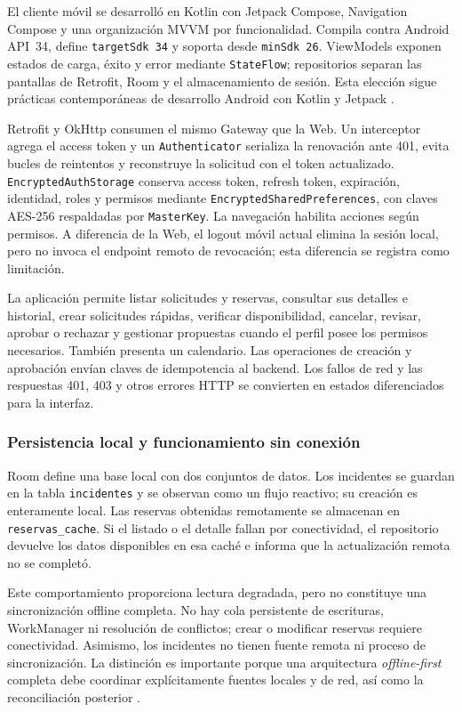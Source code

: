 El cliente móvil se desarrolló en Kotlin con Jetpack Compose, Navigation
Compose y una organización MVVM por funcionalidad. Compila contra Android
API~34, define \texttt{targetSdk 34} y soporta desde \texttt{minSdk 26}.
ViewModels exponen estados de carga, éxito y error mediante \texttt{StateFlow};
repositorios separan las pantallas de Retrofit, Room y el almacenamiento de
sesión. Esta elección sigue prácticas contemporáneas de desarrollo Android con
Kotlin y Jetpack \cite{spath2022proandroid}.

Retrofit y OkHttp consumen el mismo Gateway que la Web. Un interceptor agrega
el access token y un \texttt{Authenticator} serializa la renovación ante 401,
evita bucles de reintentos y reconstruye la solicitud con el token actualizado.
\texttt{EncryptedAuthStorage} conserva access token, refresh token, expiración,
identidad, roles y permisos mediante \texttt{EncryptedSharedPreferences}, con
claves AES-256 respaldadas por \texttt{MasterKey}. La navegación habilita
acciones según permisos. A diferencia de la Web, el logout móvil actual elimina
la sesión local, pero no invoca el endpoint remoto de revocación; esta diferencia
se registra como limitación.

La aplicación permite listar solicitudes y reservas, consultar sus detalles e
historial, crear solicitudes rápidas, verificar disponibilidad, cancelar,
revisar, aprobar o rechazar y gestionar propuestas cuando el perfil posee los
permisos necesarios. También presenta un calendario. Las operaciones de creación
y aprobación envían claves de idempotencia al backend. Los fallos de red y las
respuestas 401, 403 y otros errores HTTP se convierten en estados diferenciados
para la interfaz.

\subsubsection{Persistencia local y funcionamiento sin conexión}

Room define una base local con dos conjuntos de datos. Los incidentes se guardan
en la tabla \texttt{incidentes} y se observan como un flujo reactivo; su creación
es enteramente local. Las reservas obtenidas remotamente se almacenan en
\texttt{reservas\_cache}. Si el listado o el detalle fallan por conectividad, el
repositorio devuelve los datos disponibles en esa caché e informa que la
actualización remota no se completó.

Este comportamiento proporciona lectura degradada, pero no constituye una
sincronización offline completa. No hay cola persistente de escrituras,
WorkManager ni resolución de conflictos; crear o modificar reservas requiere
conectividad. Asimismo, los incidentes no tienen fuente remota ni proceso de
sincronización. La distinción es importante porque una arquitectura
\emph{offline-first} completa debe coordinar explícitamente fuentes locales y de
red, así como la reconciliación posterior \cite{android2026offlinefirst}.

